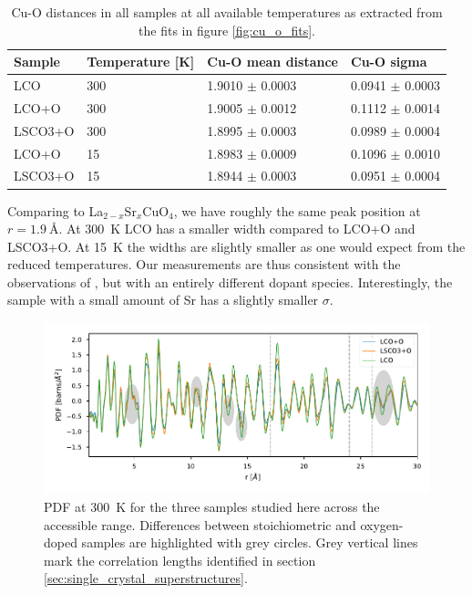 \begin{table}
    \centering
    \begin{tabular}{llll}
        \toprule
          Sample & Temperature [K] &   Cu-O mean distance &           Cu-O sigma \\
        \midrule
             LCO &             300 &  1.9010 $\pm$ 0.0003 &  0.0941 $\pm$ 0.0003 \\
           LCO+O &             300 &  1.9005 $\pm$ 0.0012 &  0.1112 $\pm$ 0.0014 \\
         LSCO3+O &             300 &  1.8995 $\pm$ 0.0003 &  0.0989 $\pm$ 0.0004 \\
           LCO+O &              15 &  1.8983 $\pm$ 0.0009 &  0.1096 $\pm$ 0.0010 \\
         LSCO3+O &              15 &  1.8944 $\pm$ 0.0003 &  0.0951 $\pm$ 0.0004 \\
        \bottomrule
    \end{tabular}
    \caption{Cu-O distances in all samples at all available temperatures as extracted from the fits in figure \ref{fig:cu_o_fits}.}
    \label{tab:cu_o_fits}
\end{table}

Comparing to La$_{2-x}$Sr$_x$CuO$_{4}$, we have roughly the same peak position at $r=\SI{1.9}{\angstrom}$. At \SI{300}{\kelvin} LCO has a smaller width compared to LCO+O and LSCO3+O. At \SI{15}{\kelvin} the widths are slightly smaller as one would expect from the reduced temperatures. Our measurements are thus consistent with the observations of \cite{Bozin2000}, but with an entirely different dopant species. Interestingly, the sample with a small amount of Sr has a slightly smaller $\sigma$.

\begin{figure}
    \centering
    \includegraphics[width=\textwidth]{fig/pdf/300k_all.pdf}
    \caption{PDF at \SI{300}{\kelvin} for the three samples studied here across the accessible range. Differences between stoichiometric and oxygen-doped samples are highlighted with grey circles. Grey vertical lines mark the correlation lengths identified in section \ref{sec:single_crystal_superstructures}.}
    \label{fig:pdf_all_300K}
\end{figure}

